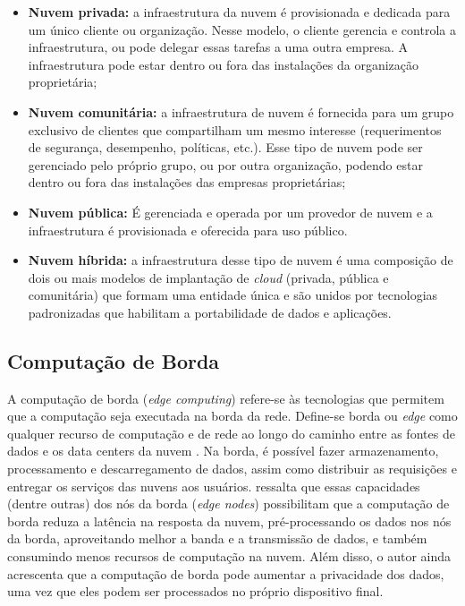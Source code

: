 \begin{itemize}
    
    \item \textbf{Nuvem privada:} a infraestrutura da nuvem é provisionada e
    dedicada para um único cliente ou organização. Nesse modelo, o cliente
    gerencia e controla a infraestrutura, ou pode delegar essas tarefas a uma
    outra empresa. A infraestrutura pode estar dentro ou fora das instalações
    da organização proprietária;

    \item \textbf{Nuvem comunitária:} a infraestrutura de nuvem é fornecida para
    um grupo exclusivo de clientes que compartilham um mesmo interesse
    (requerimentos de segurança, desempenho, políticas, etc.). Esse tipo de
    nuvem pode ser gerenciado pelo próprio grupo, ou por outra organização,
    podendo estar dentro ou fora das instalações das empresas proprietárias;

    \item \textbf{Nuvem pública:} É gerenciada e operada por um provedor de nuvem
    e a infraestrutura é provisionada e oferecida para uso público.
    
    \item \textbf{Nuvem híbrida:} a infraestrutura desse tipo de nuvem é uma
    composição de dois ou mais modelos de implantação de \emph{cloud} (privada,
    pública e comunitária) que formam uma entidade única e são unidos por
    tecnologias padronizadas que habilitam a portabilidade de dados e
    aplicações.

\end{itemize}

\subsection{Computação de Borda}

A computação de borda (\emph{edge computing}) refere-se às
tecnologias que permitem que a computação seja executada na borda da rede.
Define-se borda ou \emph{edge} como qualquer recurso de computação e de rede ao
longo do caminho entre as fontes de dados e os data centers da nuvem
\cite{Shi2016}. Na borda, é possível fazer armazenamento, processamento e
descarregamento de dados, assim como distribuir as requisições e entregar os
serviços das nuvens aos usuários.  ressalta que essas
capacidades (dentre outras) dos nós da borda (\emph{edge nodes}) possibilitam que a
computação de borda reduza a latência na resposta da nuvem, pré-processando os
dados nos nós da borda, aproveitando melhor a banda e a transmissão de dados, e
também consumindo menos recursos de computação na nuvem. Além disso, o autor
ainda acrescenta que a computação de borda pode aumentar a privacidade dos
dados, uma vez que eles podem ser processados no próprio dispositivo final.

